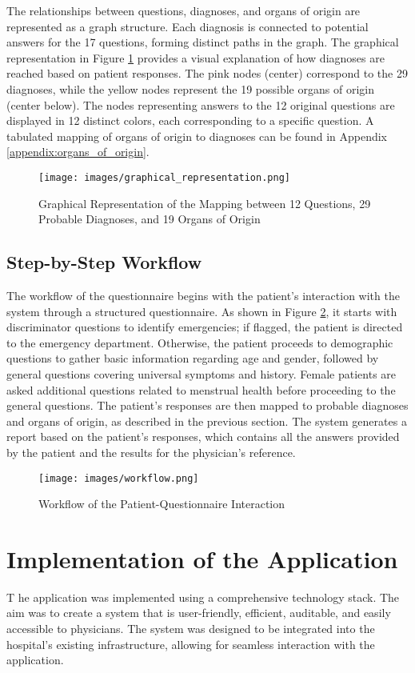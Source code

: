\noindent The relationships between questions, diagnoses, and organs of origin are represented as a graph structure. Each diagnosis is connected to potential answers for the 17 questions, forming distinct paths in the graph. The graphical representation in Figure \ref{fig:graphical_representation} provides a visual explanation of how diagnoses are reached based on patient responses. The pink nodes (center) correspond to the 29 diagnoses, while the yellow nodes represent the 19 possible organs of origin (center below). The nodes representing answers to the 12 original questions are displayed in 12 distinct colors, each corresponding to a specific question. A tabulated mapping of organs of origin to diagnoses can be found in Appendix \ref{appendix:organs_of_origin}.
\begin{figure}[H]
    \centering
    \texttt{[image: images/graphical\_representation.png]}
    \caption{Graphical Representation of the Mapping between 12 Questions, 29 Probable Diagnoses, and 19 Organs of Origin}
    \label{fig:graphical_representation}
\end{figure}

\subsection{Step-by-Step Workflow}
The workflow of the questionnaire begins with the patient's interaction with the system through a structured questionnaire. As shown in Figure \ref{fig:workflow}, it starts with discriminator questions to identify emergencies; if flagged, the patient is directed to the emergency department. Otherwise, the patient proceeds to demographic questions to gather basic information regarding age and gender, followed by general questions covering universal symptoms and history. Female patients are asked additional questions related to menstrual health before proceeding to the general questions. The patient's responses are then mapped to probable diagnoses and organs of origin, as described in the previous section. The system generates a report based on the patient's responses, which contains all the answers provided by the patient and the results for the physician's reference.
\begin{figure}[H]
    \centering
    \texttt{[image: images/workflow.png]}
    \caption{Workflow of the Patient-Questionnaire Interaction}
    \label{fig:workflow}
\end{figure}

\section{Implementation of the Application}
\lettrine{T}{ }he application was implemented using a comprehensive technology stack. The aim was to create a system that is user-friendly, efficient, auditable, and easily accessible to physicians. The system was designed to be integrated into the hospital's existing infrastructure, allowing for seamless interaction with the application.\\

